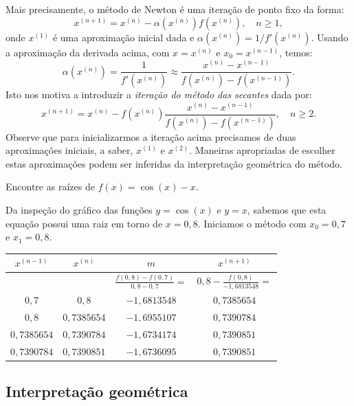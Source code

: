 Mais precisamente, o método de Newton é uma iteração de ponto fixo da forma:
\begin{equation}
  x^{(n+1)} = x^{(n)} - \alpha(x^{(n)})f(x^{(n)}),\quad n\geq 1,
\end{equation}
onde $x^{(1)}$ é uma aproximação inicial dada e $\alpha(x^{(n)}) = 1/f'(x^{(n)})$. Usando a aproximação da derivada acima, com $x = x^{(n)}$ e $x_0 = x^{(n-1)}$, temos:
\begin{equation}
  \alpha(x^{(n)}) = \frac{1}{f'(x^{(n)})} \approx  \frac{x^{(n)} - x^{(n-1)}}{f(x^{(n)}) - f(x^{(n-1)})}.
\end{equation}
Isto nos motiva a introduzir a \emph{iteração do método das secantes} dada por:
\begin{equation}
  x^{(n+1)} = x^{(n)} - f(x^{(n)})\frac{x^{(n)} - x^{(n-1)}}{f(x^{(n)}) - f(x^{(n-1)})},\quad n\geq 2.
\end{equation}
Observe que para inicializarmos a iteração acima precisamos de duas aproximações iniciais, a saber, $x^{(1)}$ e $x^{(2)}$. Maneiras apropriadas de escolher estas aproximações podem ser inferidas da interpretação geométrica do método.

\begin{ex} Encontre as raízes de $f(x)=\cos(x)-x$.
\end{ex}
\begin{sol}
Da inspeção do gráfico das funções $y=\cos(x)$ e $y=x$, sabemos que esta equação possui uma raiz em torno de $x=0,8$. Iniciamos o método com $x_0=0,7$ e $x_1=0,8$.
\begin{center}
\begin{tabular}{|c|c|c|c|}\hline
$x^{(n-1)}$ & $x^{(n)}$ & $m$ & $x^{(n+1)}$\\\hline
 & & $\frac{f(0,8)-f(0,7)}{0,8-0,7} =$ & $0,8- \frac{f(0,8)}{-1,6813548}=$\\
$0,7$ & $0,8$ & $-1,6813548$ & $0,7385654$\\\hline
$0,8$ & $0,7385654$ & $-1,6955107$ & $0,7390784$ \\\hline
 $0,7385654$ & $0,7390784$ &  $-1,6734174$ & $0,7390851$ \\\hline
$0,7390784$ & $0,7390851$ & $-1,6736095$ & $0,7390851$ \\\hline
\end{tabular}
\end{center}
\end{sol}

\subsection{Interpretação geométrica}

